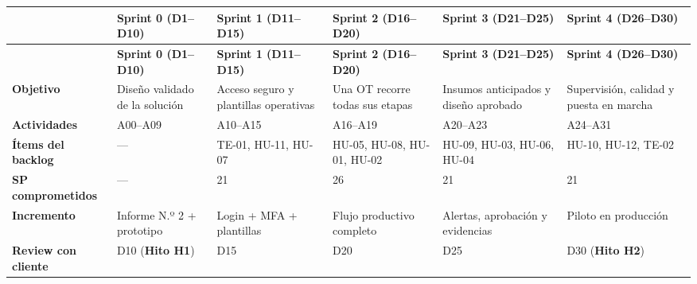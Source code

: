 \documentclass[11pt,a4paper]{article}
\begin{document}
\begingroup\footnotesize
\begin{longtable}{@{}>{\raggedright\arraybackslash\hspace{0pt}}p{}>{\raggedright\arraybackslash\hspace{0pt}}p{}>{\raggedright\arraybackslash\hspace{0pt}}p{}>{\raggedright\arraybackslash\hspace{0pt}}p{}>{\raggedright\arraybackslash\hspace{0pt}}p{}>{\raggedright\arraybackslash\hspace{0pt}}p{}@{}}
\toprule
 & \textbf{Sprint 0 (D1--D10)} & \textbf{Sprint 1 (D11--D15)} & \textbf{Sprint 2 (D16--D20)} & \textbf{Sprint 3 (D21--D25)} & \textbf{Sprint 4 (D26--D30)} \\ \midrule
\endfirsthead
\toprule
 & \textbf{Sprint 0 (D1--D10)} & \textbf{Sprint 1 (D11--D15)} & \textbf{Sprint 2 (D16--D20)} & \textbf{Sprint 3 (D21--D25)} & \textbf{Sprint 4 (D26--D30)} \\ \midrule
\endhead
\bottomrule
\endlastfoot
\textbf{Objetivo} & Diseño validado de la solución & Acceso seguro y plantillas operativas & Una OT recorre todas sus etapas & Insumos anticipados y diseño aprobado & Supervisión, calidad y puesta en marcha \\ \addlinespace[0.25em]
\textbf{Actividades} & \mbox{A00--A09} & \mbox{A10--A15} & \mbox{A16--A19} & \mbox{A20--A23} & \mbox{A24--A31} \\ \addlinespace[0.25em]
\textbf{Ítems del backlog} & \mbox{---} & \mbox{TE-01}, \mbox{HU-11}, \mbox{HU-07} & \mbox{HU-05}, \mbox{HU-08}, \mbox{HU-01}, \mbox{HU-02} & \mbox{HU-09}, \mbox{HU-03}, \mbox{HU-06}, \mbox{HU-04} & \mbox{HU-10}, \mbox{HU-12}, \mbox{TE-02} \\ \addlinespace[0.25em]
\textbf{SP comprometidos} & \mbox{---} & \mbox{21} & \mbox{26} & \mbox{21} & \mbox{21} \\ \addlinespace[0.25em]
\textbf{Incremento} & Informe N.º 2 + prototipo & Login + MFA + plantillas & Flujo productivo completo & Alertas, aprobación y evidencias & Piloto en producción \\ \addlinespace[0.25em]
\textbf{Review con cliente} & D10 (\textbf{Hito H1}) & \mbox{D15} & \mbox{D20} & \mbox{D25} & D30 (\textbf{Hito H2}) \\
\end{longtable}
\endgroup
\end{document}
